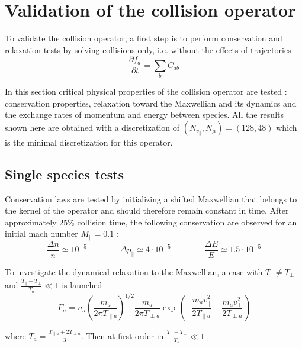 \documentclass[11pt,preprint]{elsarticle}
\begin{document}
\section{Validation of the collision operator}

To validate the collision operator, a first step is to perform conservation
and relaxation tests by solving collisions only, i.e. without the
effects of trajectories 
\[
\frac{\partial f_{a}}{\partial t}=\sum_{b}C_{ab}
\]


In this section critical physical properties of the collision operator are tested : conservation properties, relaxation toward the Maxwellian and its dynamics and the exchange rates of momentum and energy between species. All the results shown here are obtained with a discretization of $(N_{v_{\parallel}},N_{\mu})=(128,48)$ which is the minimal discretization for this operator.


\subsection{Single species tests}

Conservation laws are tested by initializing a shifted Maxwellian that belongs to the kernel of the operator and should therefore remain constant in time. After approximately $25\%$ collision time, the following conservation
are observed for an initial mach number $M_{\parallel}=0.1$ :
\[
\frac{\Delta n}{n}\simeq10^{-5}\hspace{1em}\hspace{1em}\hspace{1em}\hspace{1em}\Delta p_{\parallel}\simeq4\cdot10^{-5}\hspace{1em}\hspace{1em}\hspace{1em}\hspace{1em}\frac{\Delta E}{E}\simeq1.5\cdot10^{-5}
\]


To investigate the dynamical relaxation to the Maxwellian, a case
with $T_{\parallel}\neq T_{\perp}$ and $\frac{T_{\parallel}-T_{\perp}}{T_{a}}\ll1$
is launched 
\[
F_{a}=n_{a}\left(\frac{m_{a}}{2\pi T_{\parallel a}}\right)^{1/2}\frac{m_{a}}{2\pi T_{\perp a}}\exp\left(-\frac{m_{a}v_{\parallel}^{2}}{2T_{\parallel a}}-\frac{m_{a}v_{\perp}^{2}}{2T_{\perp a}}\right)
\]


where $T_{a}=\frac{T_{\parallel a}+2T_{\perp a}}{3}$. Then at first
order in $\frac{T_{\parallel}-T_{\perp}}{T_{a}}\ll1$ 
\end{document}
